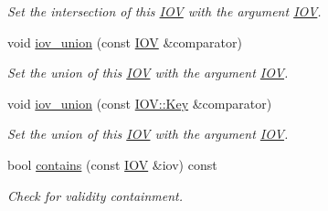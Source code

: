 \begin{DoxyCompactItemize}
\begin{DoxyCompactList}\small\item\em Set the intersection of this \hyperlink{class_d_d4hep_1_1_i_o_v}{IOV} with the argument \hyperlink{class_d_d4hep_1_1_i_o_v}{IOV}. \item\end{DoxyCompactList}\item 
void \hyperlink{class_d_d4hep_1_1_i_o_v_aa0261c65bd7ffa708862bdd0e69845d9}{iov\_\-union} (const \hyperlink{class_d_d4hep_1_1_i_o_v}{IOV} \&comparator)
\begin{DoxyCompactList}\small\item\em Set the union of this \hyperlink{class_d_d4hep_1_1_i_o_v}{IOV} with the argument \hyperlink{class_d_d4hep_1_1_i_o_v}{IOV}. \item\end{DoxyCompactList}\item 
void \hyperlink{class_d_d4hep_1_1_i_o_v_ad6a050933305a95b61d26975c057590e}{iov\_\-union} (const \hyperlink{class_d_d4hep_1_1_i_o_v_a07cb46dc875296dc9cccf4ff370104ae}{IOV::Key} \&comparator)
\begin{DoxyCompactList}\small\item\em Set the union of this \hyperlink{class_d_d4hep_1_1_i_o_v}{IOV} with the argument \hyperlink{class_d_d4hep_1_1_i_o_v}{IOV}. \item\end{DoxyCompactList}\item 
bool \hyperlink{class_d_d4hep_1_1_i_o_v_abe1a3f5122ab3e9aa97a82a1444a515d}{contains} (const \hyperlink{class_d_d4hep_1_1_i_o_v}{IOV} \&iov) const 
\begin{DoxyCompactList}\small\item\em Check for validity containment. \item\end{DoxyCompactList}\end{DoxyCompactItemize}
